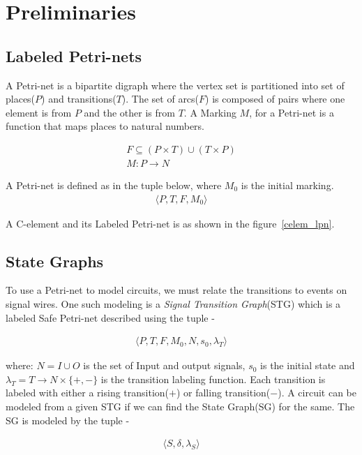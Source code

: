 \documentclass[10pt,journal,compsoc]{IEEEtran}
\begin{document}
\section{Preliminaries}

\subsection{Labeled Petri-nets}
A Petri-net is a bipartite digraph where the vertex set is partitioned into set of places($P$) and transitions($T$). The set of arcs($F$) is composed of pairs where one element is from $P$ and the other is from $T$. A Marking $M$, for a Petri-net is a function that maps places to natural numbers. 

\begin{align*}
F \subseteq (P \times T) \cup (T \times P) \\
M : P \rightarrow N
\end{align*}

A Petri-net is defined as in the tuple below, where $M_0$ is the initial marking. 
\begin{align*}
\langle P,T,F,M_0 \rangle
\end{align*}

A C-element and its Labeled Petri-net is as shown in the figure~\ref{celem_lpn}. 

\subsection{State Graphs}
To use a Petri-net to model circuits, we must relate the transitions to events on signal wires.
One such modeling is a \textit{Signal Transition Graph}(STG) which is a labeled Safe Petri-net 
described using the tuple - 

\begin{align*}
\langle P,T,F,M_0,N,s_0,\lambda_T\rangle
\end{align*}  

where: $N=I\cup O$ is the set of Input and output signals, $s_0$ is the initial state and $\lambda_T = T \rightarrow N \times \{+,-\}$ 
is the transition labeling function. Each transition is labeled with either a rising transition($+$) or falling transition($-$).
A circuit can be modeled from a given STG if we can find the State Graph(SG) for the same. The SG is modeled by the tuple -

\begin{align*}
\langle S, \delta, \lambda_S \rangle
\end{align*}   
\end{document}
